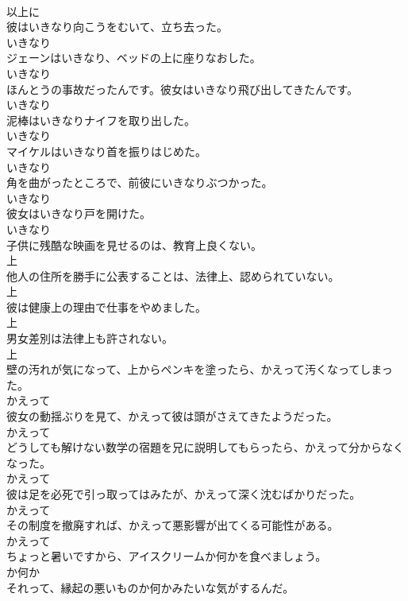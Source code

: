 \documentclass[8pt]{extreport}
\begin{document}
\begin{CJK}{UTF8}{min}
\\	以上に
\\	彼はいきなり向こうをむいて、立ち去った。	
\\	いきなり
\\	ジェーンはいきなり、ベッドの上に座りなおした。	
\\	いきなり
\\	ほんとうの事故だったんです。彼女はいきなり飛び出してきたんです。	
\\	いきなり
\\	泥棒はいきなりナイフを取り出した。	
\\	いきなり
\\	マイケルはいきなり首を振りはじめた。	
\\	いきなり
\\	角を曲がったところで、前彼にいきなりぶつかった。	
\\	いきなり
\\	彼女はいきなり戸を開けた。	
\\	いきなり
\\	子供に残酷な映画を見せるのは、教育上良くない。	
\\	上
\\	他人の住所を勝手に公表することは、法律上、認められていない。	
\\	上
\\	彼は健康上の理由で仕事をやめました。	
\\	上
\\	男女差別は法律上も許されない。	
\\	上
\\	壁の汚れが気になって、上からペンキを塗ったら、かえって汚くなってしまった。	
\\	かえって
\\	彼女の動揺ぶりを見て、かえって彼は頭がさえてきたようだった。	
\\	かえって
\\	どうしても解けない数学の宿題を兄に説明してもらったら、かえって分からなくなった。	
\\	かえって
\\	彼は足を必死で引っ取ってはみたが、かえって深く沈むばかりだった。	
\\	かえって
\\	その制度を撤廃すれば、かえって悪影響が出てくる可能性がある。	
\\	かえって
\\	ちょっと暑いですから、アイスクリームか何かを食べましょう。	
\\	か何か
\\	それって、縁起の悪いものか何かみたいな気がするんだ。	

\end{CJK}
\end{document}
